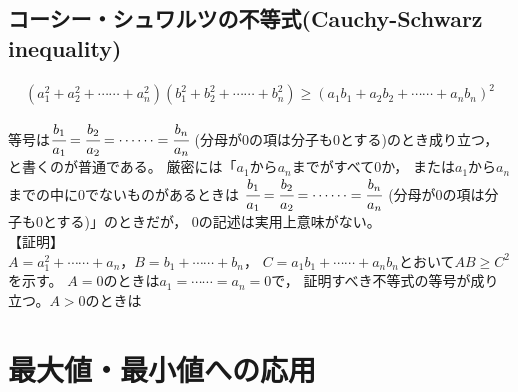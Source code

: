 \documentclass[autodetect-engine,ja=standard, 10.5pt, a4paper, titlepage]{bxjsarticle}
\numberwithin{equation}{section} %
\begin{document}
\subsection{コーシー・シュワルツの不等式(Cauchy-Schwarz inequality)}
\begin{fleqn}[20pt]
  \begin{align*}
    (a_{1}^2+a_{2}^2 + \cdots\cdots + a_{n}^2)(b_{1}^2+b_{2}^2 + \cdots\cdots + b_{n}^2)
    \geq (a_{1}b_{1} + a_{2}b_{2} + \cdots \cdots + a_{n}b_{n})^2
  \end{align*}
\end{fleqn}
等号は$\cfrac{b_{1}}{a_{1}}=\cfrac{b_{2}}{a_{2}}= \cdots\cdots =\cfrac{b_{n}}{a_{n}}$
(分母が0の項は分子も0とする)のとき成り立つ，と書くのが普通である。
厳密には「$a_{1}$から$a_{n}$までがすべて0か，
または$a_{1}$から$a_{n}$までの中に0でないものがあるときは
$\cfrac{b_{1}}{a_{1}}=\cfrac{b_{2}}{a_{2}}= \cdots\cdots =\cfrac{b_{n}}{a_{n}}$
(分母が0の項は分子も0とする)」のときだが，
0の記述は実用上意味がない。\\
【証明】\\
$A=a_{1}^2+\cdots\cdots + a_{n}$，$B=b_{1}+\cdots\cdots+b_{n}$，
$C=a_{1}b_{1}+\cdots\cdots +a_{n}b_{n}$とおいて$AB\geq C^2$を示す。
$A=0$のときは$a_{1} = \cdots\cdots =a_{n}=0$で，
証明すべき不等式の等号が成り立つ。$A>0$のときは


\section{最大値・最小値への応用}\label{sec:apply-to-max-min}
\end{document}
